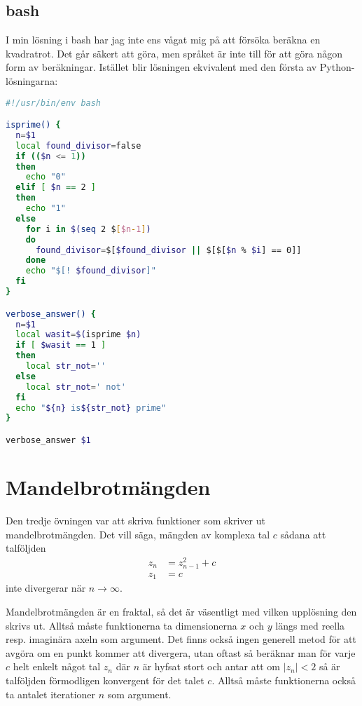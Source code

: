 \documentclass[10pt, twoside,a4paper]{article}
\begin{document}
\subsection{bash}
I min lösning i bash har jag inte ens vågat mig på att försöka beräkna en kvadratrot. Det går säkert att göra, men språket är inte till för att göra någon form av beräkningar. Istället blir lösningen ekvivalent med den första av Python-lösningarna:
\begin{lstlisting}[language=bash]
#!/usr/bin/env bash

isprime() {
  n=$1
  local found_divisor=false
  if (($n <= 1))
  then
    echo "0"
  elif [ $n == 2 ]
  then
    echo "1"
  else
    for i in $(seq 2 $[$n-1])
    do
      found_divisor=$[$found_divisor || $[$[$n % $i] == 0]]
    done
    echo "$[! $found_divisor]"
  fi
}

verbose_answer() {
  n=$1
  local wasit=$(isprime $n)
  if [ $wasit == 1 ]
  then
    local str_not=''
  else
    local str_not=' not'
  fi
  echo "${n} is${str_not} prime"
}

verbose_answer $1
\end{lstlisting}



\newpage
\section{Mandelbrotmängden}
Den tredje övningen var att skriva funktioner som skriver ut mandelbrotmängden. Det vill säga, mängden av komplexa tal $c$ sådana att talföljden
\begin{align}
z_n &= z_{n-1}^2 + c \\
z_1 &= c
\end{align}
inte divergerar när $n \to \infty$.

Mandelbrotmängden är en fraktal, så det är väsentligt med vilken upplösning den skrivs ut. Alltså måste funktionerna ta dimensionerna $x$ och $y$ längs med reella resp. imaginära axeln som argument. Det finns också ingen generell metod för att avgöra om en punkt kommer att divergera, utan oftast så beräknar man för varje $c$ helt enkelt något tal $z_n$ där $n$ är hyfsat stort och antar att om $\left| z_n \right| < 2$ så är talföljden förmodligen konvergent för det talet $c$. Alltså måste funktionerna också ta antalet iterationer $n$ som argument.
\end{document}
